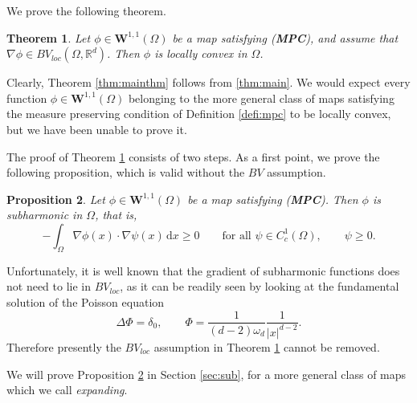 \documentclass[11pt, twoside, reqno]{amsart}
\newcounter{assu}
\theoremstyle{definition} \newtheorem{definition}{Definition}[section]
\theoremstyle{definition} \newtheorem{remark}[definition]{Remark}
\theoremstyle{plain} \newtheorem{lemma}[definition]{Lemma}
\theoremstyle{plain} \newtheorem{proposition}[definition]{Proposition}
\theoremstyle{plain} \newtheorem{theorem}[definition]{Theorem}
\theoremstyle{plain} \newtheorem{corollary}[definition]{Corollary}
\theoremstyle{definition} \newtheorem{example}[definition]{Example}
\theoremstyle{plain} \newtheorem{claim}[clai]{Claim}
\theoremstyle{definition} \newtheorem{assumption}[definition]{Assumption}
\newcommand{\1}{\mathbbm 1}
\numberwithin{equation}{section} %
\theoremstyle{plain} \newtheorem*{theorem*}{Theorem}
\theoremstyle{plain} \newtheorem{mthm}[maintheorem]{Main Theorem}
\theoremstyle{plain} \newtheorem*{mthm*}{Main Theorem}
\theoremstyle{plain} \newtheorem*{conjecture*}{Conjecture}
\theoremstyle{plain} \newtheorem{conjecture}[definition]{Conjecture}
\theoremstyle{plain} \newtheorem*{problem*}{Problem}
\begin{document}
\vspace{0.3cm}
We prove the following theorem. 
\begin{theorem}\label{thm:main}
    Let $\phi \in \mathbf W^{1,1}(\Omega)$ be a map satisfying \emph{(\textbf{MPC})}, and assume that $\nabla \phi \in BV_{loc}(\Omega, \mathbb R^d)$. Then $\phi$ is locally convex in $\Omega$.
\end{theorem}
Clearly, Theorem \ref{thm:mainthm} follows from \eqref{thm:main}. We would expect every function $\phi \in \mathbf W^{1,1}(\Omega)$ belonging to the more general class of maps satisfying the measure preserving condition of Definition \ref{defi:mpc} to be locally convex, but we have been unable to prove it.

\vspace{0.3cm}
The proof of Theorem \ref{thm:main} consists of two steps. As a first point, we prove the following proposition, which is valid without the $BV$ assumption.

\begin{proposition}\label{prop:sub}
Let $\phi \in \mathbf W^{1,1}(\Omega)$ be a map satisfying \emph{(\textbf{MPC})}. Then $\phi$ is subharmonic in $\Omega$, that is,
\begin{equation}\label{eq:sub}
    - \int_{\Omega} \nabla \phi(x) \cdot \nabla \psi(x) \, \mathrm{d} x \geq 0 \qquad \text{for all $\psi \in C^1_c(\Omega)$}, \qquad \psi \geq 0.
\end{equation}
\end{proposition}
Unfortunately, it is well known that the gradient of subharmonic functions does not need to lie in $BV_{loc}$, as it can be readily seen by looking at the fundamental solution of the Poisson equation
$$
\Delta \Phi = \delta_0, \qquad \Phi = \frac{1}{(d-2) \omega_d}\frac{1}{|x|^{d-2}}.
$$
Therefore presently the $BV_{loc}$ assumption in Theorem \ref{thm:main} cannot be removed.

\vspace{0.3cm}
We will prove Proposition \ref{prop:sub} in Section \ref{sec:sub}, for a more general class of maps which we call \emph{expanding}.
\end{document}
